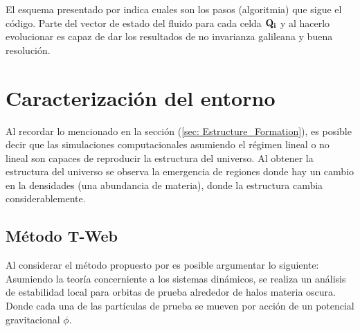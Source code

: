 El esquema presentado por \cite{springel2010} indica cuales son los pasos (algoritmia) que sigue el código. Parte del vector de estado del fluido para cada celda ${\bf{Q_{i}}}$ y al hacerlo evolucionar es capaz de dar los resultados de no invarianza galileana y buena resolución. 

\section{Caracterización del entorno}
\label{sec: Caracterizacion entorno}

Al recordar lo mencionado en la sección (\ref{sec: Estructure_Formation}), es posible decir que las simulaciones computacionales asumiendo el régimen lineal o no lineal son capaces de reproducir la estructura del universo. Al obtener la estructura del universo se observa la emergencia de regiones donde hay un cambio en la densidades (una abundancia de materia), donde la estructura cambia considerablemente.

    \subsection{Método T-Web}
    \label{subsec: Metodo_T-web}
Al considerar el método propuesto por \cite{hahn2007} es posible argumentar lo siguiente: Asumiendo la teoría concerniente a los sistemas dinámicos, se realiza un análisis de estabilidad local para orbitas de prueba alrededor de halos materia oscura. Donde cada una de las partículas de prueba se mueven por acción de un potencial gravitacional $\phi$.

